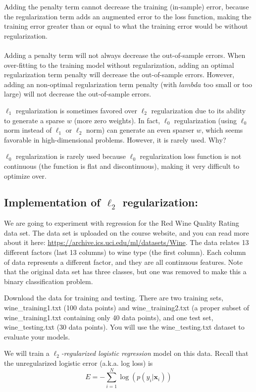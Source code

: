 Adding the penalty term cannot decrease the training (in-sample) error, because the regularization term adds an augmented error to the loss function, making the training error greater than or equal to what the training error would be without regularization.\\
\\
Adding a penalty term will not always decrease the out-of-sample errors. When over-fitting to the training model without regularization, adding an optimal regularization term penalty will decrease the out-of-sample errors. However, adding an non-optimal regularization term penalty (with $lambda$ too small or too large) will not decrease the out-of-sample errors.

\problem[4]
$\ell_1$ regularization is sometimes favored over $\ell_2$ regularization due to its ability to generate a sparse $w$ (more zero weights).
In fact, $\ell_0$ regularization (using $\ell_0$ norm instead of $\ell_1$ or $\ell_2$ norm) can generate an even sparser $w$, which seems favorable in high-dimensional problems.
However, it is rarely used.  Why?

$\ell_0$ regularization is rarely used because $\ell_0$ regularization loss function is not continuous (the function is flat and discontinuous), making it very difficult to optimize over.

\subsection{Implementation of \texorpdfstring{$\ell_2$}{L2} regularization:}

We are going to experiment with regression for the Red Wine Quality Rating data set. The data set is uploaded on the course website, and you can read more about it here: \url{https://archive.ics.uci.edu/ml/datasets/Wine}. The data relates 13 different factors (last 13 columns) to wine type (the first column). Each column of data represents a different factor, and they are all continuous features. Note that the original data set has three classes, but one was removed to make this a binary classification problem.

Download the data for training and testing.
There are two training sets, wine\_training1.txt (100 data points) and wine\_training2.txt (a proper subset of wine\_training1.txt containing only 40 data points), and one test set, wine\_testing.txt (30 data points). You will use the wine\_testing.txt dataset to evaluate your models.

We will train a \emph{$\ell_2$-regularized logistic regression} model on this data. Recall that the unregularized logistic error (a.k.a. log loss) is
\[E = -\sum_{i=1}^{N}\log(p(y_i | \mathbf{x}_i))\]

